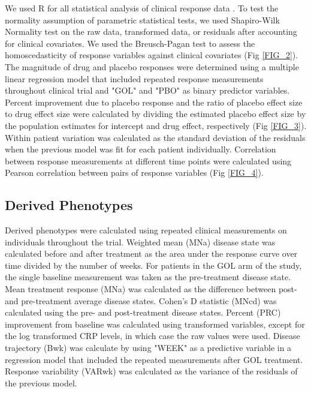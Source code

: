 We used R for all statistical analysis of clinical response data \cite{R_software}. To test the normality assumption of parametric statistical tests, we used Shapiro-Wilk Normality test on the raw data, transformed data, or residuals after accounting for clinical covariates. We used the Breusch-Pagan test to assess the homoscedasticity of response variables against clinical covariates (Fig \ref{FIG_2}). The magnitude of drug and placebo responses were determined using a multiple linear regression model that included repeated response measurements throughout clinical trial and "GOL" and "PBO" as binary predictor variables. Percent improvement due to placebo response and the ratio of placebo effect size to drug effect size were calculated by dividing the estimated placebo effect size by the population estimates for intercept and drug effect, respectively (Fig \ref{FIG_3}). Within patient variation was calculated as the standard deviation of the residuals when the previous model was fit for each patient individually. Correlation between response measurements at different time points were calculated using Pearson correlation between pairs of response variables (Fig \ref{FIG_4}).

\subsection*{Derived Phenotypes}
Derived phenotypes were calculated using repeated clinical measurements on individuals throughout the trial. Weighted mean (MNa) disease state was calculated before and after treatment as the area under the response curve over time divided by the number of weeks. For patients in the GOL arm of the study, the single baseline measurement was taken as the pre-treatment disease state. Mean treatment response (MNa) was calculated as the difference between post- and pre-treatment average disease states. Cohen's D statistic (MNcd) was calculated using the pre- and post-treatment disease states. Percent (PRC) improvement from baseline was calculated using transformed variables, except for the log transformed CRP levels, in which case the raw values were used. Disease trajectory (Bwk) was calculate by using "WEEK" as a predictive variable in a regression model that included the repeated measurements after GOL treatment. Response variability (VARwk) was calculated as the variance of the residuals of the previous model.


